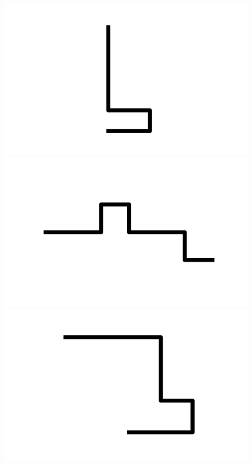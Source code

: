 \documentclass[]{report}
\begin{document}
\includegraphics[scale=.1]{pictures/21/state_cluster_shapes_412.pdf} 
\includegraphics[scale=.1]{pictures/21/state_cluster_shapes_413.pdf} 
\includegraphics[scale=.1]{pictures/21/state_cluster_shapes_414.pdf} 
\end{document}
